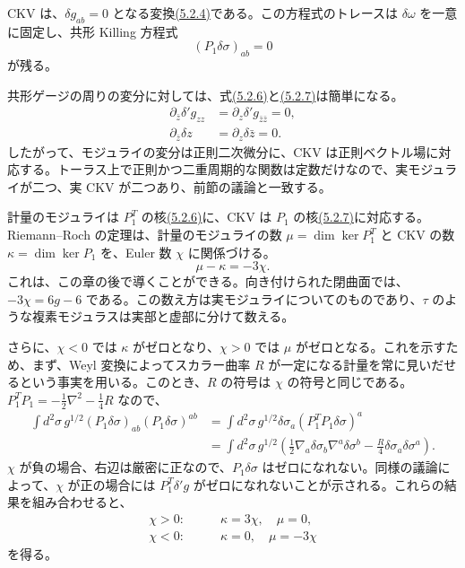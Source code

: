 CKV は、$\delta g_{ab}=0$ となる変換\hyperref[eq:5.2.4]{(5.2.4)}である。この方程式のトレースは $\delta\omega$ を一意に固定し、共形 Killing 方程式
\begin{equation}
(P_1\delta\sigma)_{ab}=0
\tag{5.2.7}\label{eq:5.2.7}
\end{equation}
が残る。

共形ゲージの周りの変分に対しては、式\hyperref[eq:5.2.6a]{(5.2.6)}と\hyperref[eq:5.2.7]{(5.2.7)}は簡単になる。
\begin{align}
\partial_{\bar z}\delta'g_{zz}
&=\partial_z\delta'g_{\bar z\bar z}=0,
\tag{5.2.8a}\label{eq:5.2.8a}\\
\partial_{\bar z}\delta z&=\partial_z\delta\bar z=0.
\tag{5.2.8b}\label{eq:5.2.8b}
\end{align}
したがって、モジュライの変分は正則二次微分に、CKV は正則ベクトル場に対応する。トーラス上で正則かつ二重周期的な関数は定数だけなので、実モジュライが二つ、実 CKV が二つあり、前節の議論と一致する。

計量のモジュライは $P_1^T$ の核\hyperref[eq:5.2.6a]{(5.2.6)}に、CKV は $P_1$ の核\hyperref[eq:5.2.7]{(5.2.7)}に対応する。Riemann--Roch の定理は、計量のモジュライの数 $\mu=\dim\ker P_1^T$ と CKV の数 $\kappa=\dim\ker P_1$ を、Euler 数 $\chi$ に関係づける。
\begin{equation}
\mu-\kappa=-3\chi.
\tag{5.2.9}\label{eq:5.2.9}
\end{equation}
これは、この章の後で導くことができる。向き付けられた閉曲面では、$-3\chi=6g-6$ である。この数え方は実モジュライについてのものであり、$\tau$ のような複素モジュラスは実部と虚部に分けて数える。

さらに、$\chi<0$ では $\kappa$ がゼロとなり、$\chi>0$ では $\mu$ がゼロとなる。これを示すため、まず、Weyl 変換によってスカラー曲率 $R$ が一定になる計量を常に見いだせるという事実を用いる。このとき、$R$ の符号は $\chi$ の符号と同じである。$P_1^TP_1=-\tfrac12\nabla^2-\tfrac14R$ なので、
\begin{equation}
\begin{aligned}
\int d^2\sigma\,g^{1/2}
(P_1\delta\sigma)_{ab}(P_1\delta\sigma)^{ab}
&=\int d^2\sigma\,g^{1/2}
\delta\sigma_a(P_1^TP_1\delta\sigma)^a\\
&=\int d^2\sigma\,g^{1/2}
\left(\frac12\nabla_a\delta\sigma_b\nabla^a\delta\sigma^b
-\frac R4\delta\sigma_a\delta\sigma^a\right).
\end{aligned}
\tag{5.2.10}\label{eq:5.2.10}
\end{equation}
$\chi$ が負の場合、右辺は厳密に正なので、$P_1\delta\sigma$ はゼロになれない。同様の議論によって、$\chi$ が正の場合には $P_1^T\delta'g$ がゼロになれないことが示される。これらの結果を組み合わせると、
\begin{align}
\chi>0:&\qquad \kappa=3\chi,\quad\mu=0,
\tag{5.2.11a}\label{eq:5.2.11a}\\
\chi<0:&\qquad \kappa=0,\quad\mu=-3\chi
\tag{5.2.11b}\label{eq:5.2.11b}
\end{align}
を得る。

